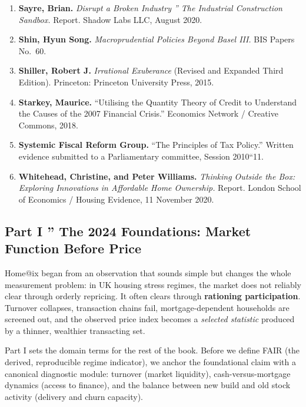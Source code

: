 \documentclass[
]{article}
\begin{document}
\begin{enumerate}
\item
  \protect{}\label{ref-sayre2020}{\textbf{Sayre, Brian.}
  \emph{Disrupt a Broken Industry '' The Industrial Construction
  Sandbox.} Report. Shadow Labs LLC, August 2020.}
\item
  \protect{}\label{ref-shin-bis}{\textbf{Shin, Hyun Song.}
  \emph{Macroprudential Policies Beyond Basel III.} BIS Papers No.~60.}
\item
  \protect{}\label{ref-shiller2015}{\textbf{Shiller, Robert
  J.} \emph{Irrational Exuberance} (Revised and Expanded Third Edition).
  Princeton: Princeton University Press, 2015.}
\item
  \protect{}\label{ref-starkey2018}{\textbf{Starkey,
  Maurice.} ``Utilising the Quantity Theory of Credit to Understand the
  Causes of the 2007 Financial Crisis.'' Economics Network / Creative
  Commons, 2018.}
\item
  \protect{}\label{ref-sfrg2010}{\textbf{Systemic Fiscal
  Reform Group.} ``The Principles of Tax Policy.'' Written evidence
  submitted to a Parliamentary committee, Session 2010``11.}
\item
  \protect{}\label{ref-whitehead2020}{\textbf{Whitehead,
  Christine, and Peter Williams.} \emph{Thinking Outside the Box:
  Exploring Innovations in Affordable Home Ownership.} Report. London
  School of Economics / Housing Evidence, 11 November 2020.}
\end{enumerate}

\protect{}\label{part1}
\subsection{Part I '' The 2024 Foundations: Market Function Before
Price}\label{part-i-the-2024-foundations-market-function-before-price}

Home@ix began from an observation that sounds simple but changes the
whole measurement problem: in UK housing stress regimes, the market does
not reliably clear through orderly repricing. It often clears through
\textbf{rationing participation}. Turnover collapses, transaction chains
fail, mortgage-dependent households are screened out, and the observed
price index becomes a \emph{selected statistic} produced by a thinner,
wealthier transacting set.

Part I sets the domain terms for the rest of the book. Before we define
FAIR (the derived, reproducible regime indicator), we anchor the
foundational claim with a canonical diagnostic module: turnover (market
liquidity), cash-versus-mortgage dynamics (access to finance), and the
balance between new build and old stock activity (delivery and churn
capacity).
\end{document}
